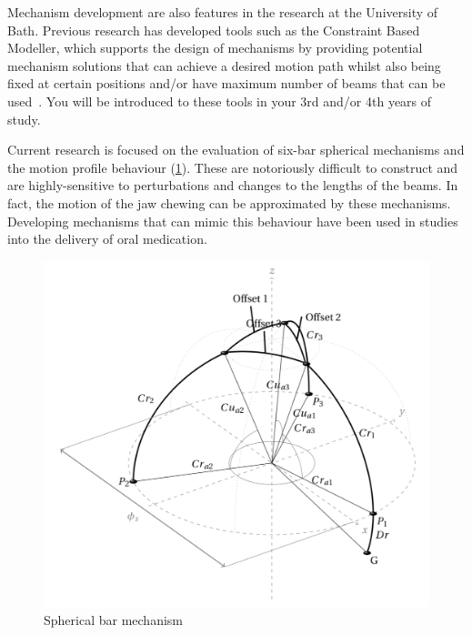 Mechanism development are also features in the research at the University of Bath. Previous research has developed tools such as the Constraint Based Modeller, which supports the design of mechanisms by providing potential mechanism solutions that can achieve a desired motion path whilst also being fixed at certain positions and/or have maximum number of beams that can be used~\cite{edmunds2011}. You will be introduced to these tools in your 3rd and/or 4th years of study.

Current research is focused on the evaluation of six-bar spherical mechanisms and the motion profile behaviour (\cref{fig-spherical}). These are notoriously difficult to construct and are highly-sensitive to perturbations and changes to the lengths of the beams. In fact, the motion of the jaw chewing can be approximated by these mechanisms. Developing mechanisms that can mimic this behaviour have been used in studies into the delivery of oral medication.

\begin{figure}[ht!]
  \centering
  \includegraphics[width=\textwidth]{figs/spherical-bar.png}
  \caption{Spherical bar mechanism}
  \label{fig-spherical}
\end{figure}
